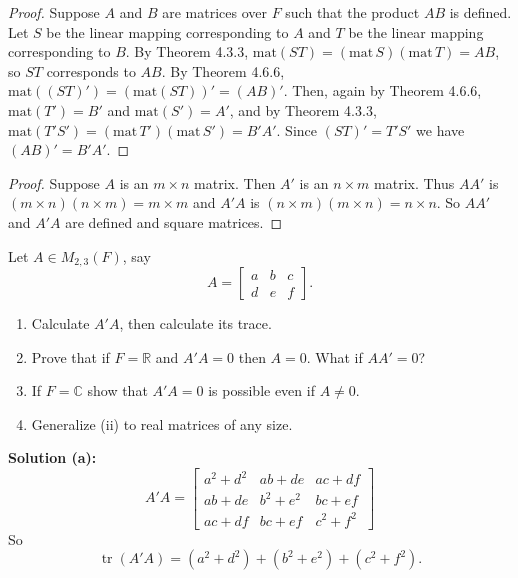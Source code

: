 \begin{proof}
    Suppose $A$ and $B$ are matrices over $F$ such that the product $AB$ is defined.
    Let $S$ be the linear mapping corresponding to $A$ and $T$ be the linear mapping corresponding to $B$.
    By Theorem 4.3.3, $\text{mat}(ST) = (\text{mat}\, S)(\text{mat}\, T) = AB$, so $ST$ corresponds to $AB$.
    By Theorem 4.6.6, $\text{mat}((ST)') = (\text{mat}(ST))' = (AB)'$.
    Then, again by Theorem 4.6.6, $\text{mat}(T') = B'$ and $\text{mat}(S') = A'$,
    and by Theorem 4.3.3, $\text{mat}(T'S') = (\text{mat}\, T')(\text{mat}\, S') = B'A'$.
    Since $(ST)' = T'S'$ we have
    $(AB)' = B'A'$.
\end{proof}

\begin{proof}
    Suppose $A$ is an $m \times n$ matrix.
    Then $A'$ is an $n \times m$ matrix.
    Thus $AA'$ is $(m \times n)(n \times m) = m \times m$
        and $A'A$ is $(n \times m)(m \times n) = n \times n$.
    So $AA'$ and $A'A$ are defined and square matrices.
\end{proof}


\begin{tcolorbox}[title=Exercise 2, breakable]
    Let $A \in M_{2, 3}(F)$, say 
    \[A =
    \begin{bmatrix}
        a & b & c \\
        d & e & f
    \end{bmatrix}.
    \]
    \begin{enumerate}
        \item Calculate $A'A$, then calculate its trace.
        \item Prove that if $F = \mathbb{R}$ and $A'A = 0$ then $A = 0$.
                What if $A A' = 0$?
        \item If $F = \mathbb{C}$ show that $A'A = 0$ is possible even if $A \ne 0$.
        \item Generalize (ii) to real matrices of any size.
    \end{enumerate}
\end{tcolorbox}

\textbf{Solution (a):}
\[
A'A = \begin{bmatrix}
    a^2 + d^2 & ab + de & ac + df \\
    ab + de & b^2 + e^2 & bc + ef \\
    ac + df & bc + ef & c^2 + f^2
\end{bmatrix}
\]
So
\[\operatorname{tr}(A'A) = (a^2 + d^2) + (b^2 + e^2) + (c^2 + f^2).\]

